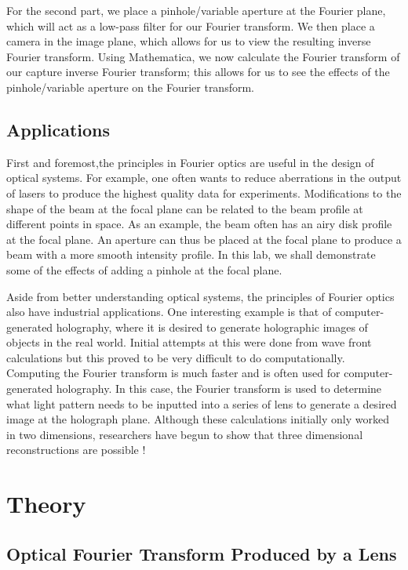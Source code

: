 \documentclass[twocolumn,amsmath,amssymb,pra]{revtex4-2}
\begin{document}
For the second part, we place a pinhole/variable aperture at the Fourier plane, which will act as a low-pass filter for our Fourier transform. We then place a camera in the image plane, which allows for us to view the resulting inverse Fourier transform. Using Mathematica, we now calculate the Fourier transform of our capture inverse Fourier transform; this allows for us to see the effects of the pinhole/variable aperture on the Fourier transform.

\subsection{Applications}

First and foremost,the principles in Fourier optics are useful in the design of optical systems. For example, one often wants to reduce aberrations in the output of lasers to produce the highest quality data for experiments. Modifications to the shape of the beam at the focal plane can be related to the beam profile at different points in space. As an example, the beam often has an airy disk profile at the focal plane. An aperture can thus be placed at the focal plane to produce a beam with a more smooth intensity profile. In this lab, we shall demonstrate some of the effects of adding a pinhole at the focal plane.

Aside from better understanding optical systems, the principles of Fourier optics also have industrial applications. One interesting example is that of computer-generated holography, where it is desired to generate holographic images of objects in the real world. Initial attempts at this were done from wave front calculations but this proved to be very difficult to do computationally. Computing the Fourier transform is much faster and is often used for computer-generated holography. In this case, the Fourier transform is used to determine what light pattern needs to be inputted into a series of lens to generate a desired image at the holograph plane. Although these calculations initially only worked in two dimensions, researchers have begun to show that three dimensional reconstructions are possible \cite{brown1969computer}! 

\section{Theory}

\subsection{Optical Fourier Transform Produced by a Lens}
\end{document}

